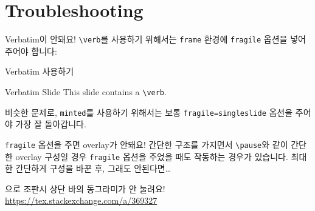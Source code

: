 \documentclass[compress]{beamer}
\begin{document}
\section{Troubleshooting}
\begin{frame}[fragile=singleslide]{Verbatim이 안돼요!}
  \verb/\verb/를 사용하기 위해서는 \verb/frame/ 환경에 \verb/fragile/ 옵션을
  넣어주어야 합니다:
  \begin{exampleblock}{Verbatim 사용하기}
    \begin{latexcode}
      \begin{frame}[fragile]{Verbatim Slide}
        This slide contains a \verb/\verb/.
      \end{frame}
    \end{latexcode}
  \end{exampleblock}

  비슷한 문제로, \verb/minted/를 사용하기 위해서는 보통
  \verb/fragile=singleslide/ 옵션을 주어야 가장 잘 돌아갑니다.
\end{frame}

\begin{frame}[fragile=singleslide]{\texttt{fragile} 옵션을 주면 overlay가 안돼요!}
  간단한 구조를 가지면서 \verb/\pause/와 같이 간단한 overlay 구성일 경우
  \texttt{fragile} 옵션을 주었을 때도 작동하는 경우가 있습니다.
  최대한 간단하게 구성을 바꾼 후, 그래도 안된다면\ldots
\end{frame}

\begin{frame}[fragile=singleslide]{으로 조판시 상단 바의 동그라미가 안 눌려요!}
  \url{https://tex.stackexchange.com/a/369327}
  \begin{latexcode}
  \end{latexcode}
\end{frame}
\end{document}
